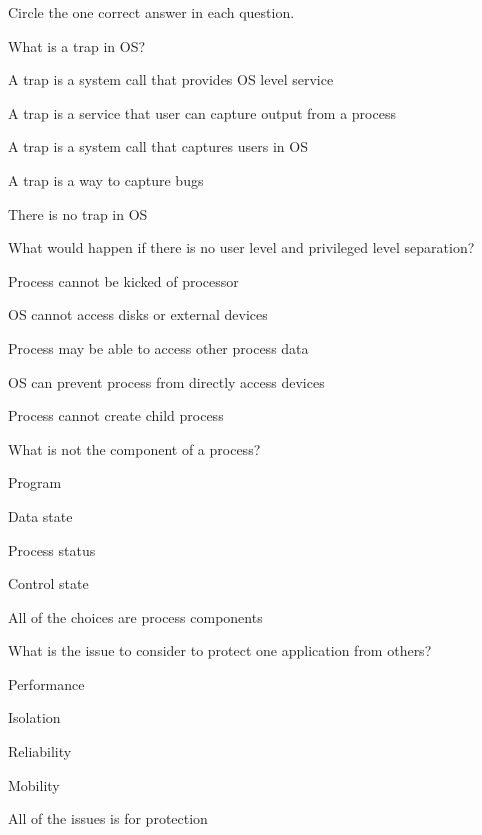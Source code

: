 \begingroup\small
\noindent Circle the one correct answer in each question.\par\smallskip
\begin{questions}\setlength{\itemsep}{0.08cm}\setcounter{question}{0}
\question What is a trap in OS?
\begin{verticalchoices}
\item A trap is a system call that provides OS level service
\item A trap is a service that user can capture output from a process
\item A trap is a system call that captures users in OS
\item A trap is a way to capture bugs
\item There is no trap in OS
\end{verticalchoices}
\question What would happen if there is no user level and privileged level separation?
\begin{verticalchoices}
\item Process cannot be kicked of processor
\item OS cannot access disks or external devices
\item Process may be able to access other process data
\item OS can prevent process from directly access devices
\item Process cannot create child process
\end{verticalchoices}
\question What is not the component of a process?
\begin{verticalchoices}
\item Program
\item Data state
\item Process status
\item Control state
\item All of the choices are process components
\end{verticalchoices}
\question What is the issue to consider to protect one application from others?
\begin{verticalchoices}
\item Performance
\item Isolation
\item Reliability
\item Mobility
\item All of the issues is for protection
\end{verticalchoices}

\end{questions}
